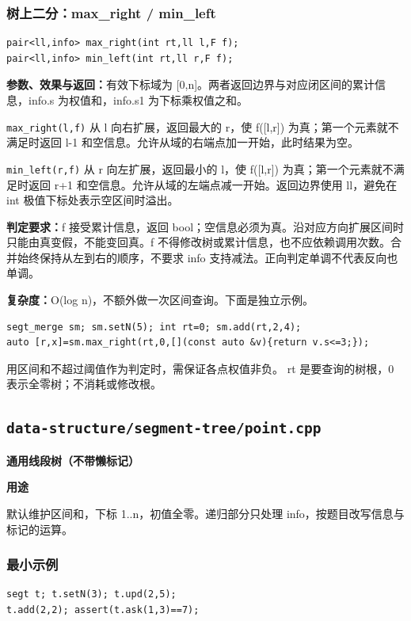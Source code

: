 \documentclass[UTF8,a4paper,10pt]{ctexart}
\newcommand{\TemplUsage}[1]{\textbf{用途}\par #1\par}
\begin{document}
\noindent\begin{minipage}{\textwidth}
\subsubsection*{树上二分：max\_right / min\_left}
\begin{lstlisting}
pair<ll,info> max_right(int rt,ll l,F f);
pair<ll,info> min_left(int rt,ll r,F f);
\end{lstlisting}
\textbf{参数、效果与返回：}有效下标域为 [0,n]。两者返回边界与对应闭区间的累计信息，info.s 为权值和，info.s1 为下标乘权值之和。

\texttt{max\_right(l,f)} 从 l 向右扩展，返回最大的 r，使 f([l,r]) 为真；第一个元素就不满足时返回 l-1 和空信息。允许从域的右端点加一开始，此时结果为空。

\texttt{min\_left(r,f)} 从 r 向左扩展，返回最小的 l，使 f([l,r]) 为真；第一个元素就不满足时返回 r+1 和空信息。允许从域的左端点减一开始。返回边界使用 ll，避免在 int 极值下标处表示空区间时溢出。

\textbf{判定要求：}f 接受累计信息，返回 bool；空信息必须为真。沿对应方向扩展区间时只能由真变假，不能变回真。f 不得修改树或累计信息，也不应依赖调用次数。合并始终保持从左到右的顺序，不要求 info 支持减法。正向判定单调不代表反向也单调。

\textbf{复杂度：}O(log n)，不额外做一次区间查询。下面是独立示例。
\begin{lstlisting}
segt_merge sm; sm.setN(5); int rt=0; sm.add(rt,2,4);
auto [r,x]=sm.max_right(rt,0,[](const auto &v){return v.s<=3;});
\end{lstlisting}
用区间和不超过阈值作为判定时，需保证各点权值非负。 rt 是要查询的树根，0 表示全零树；不消耗或修改根。
\end{minipage}\par
\clearpage
\subsection{\texttt{data-structure/segment-tree/point.cpp}}
\textbf{通用线段树（不带懒标记）}\par
\TemplUsage{默认维护区间和，下标 1..n，初值全零。递归部分只处理 info，按题目改写信息与标记的运算。}
\subsubsection*{最小示例}
\begin{lstlisting}
segt t; t.setN(3); t.upd(2,5);
t.add(2,2); assert(t.ask(1,3)==7);
\end{lstlisting}
\end{document}
